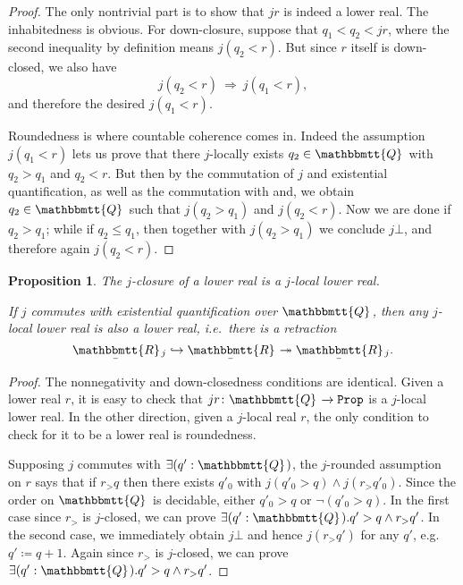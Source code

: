 \documentclass[reqno,11pt]{amsproc}
\newcommand{\tob}[1]{\todo[color=blue!40,inline]{\tn{\textbf{T:} #1}}\noindent}
\theoremstyle{plain}
\newtheorem{proposition}[theorem]{Proposition}
\theoremstyle{definition}
\newcommand{\Const}[1]{\mathtt{#1}}
\renewcommand{\to}[1][]{\xrightarrow{#1}}
\newcommand{\surj}{\twoheadrightarrow}
\newcommand{\inj}{\hookrightarrow}
\newcommand{\tn}[1]{\textnormal{#1}}
\newcommand{\ubar}[1]{\underaccent{\bar}{#1}}
\newcommand{\internal}[1]{\raisebox{-.03ex}{$\mathbbmtt{#1}$}}
\newcommand{\hs}{\hspace{1pt}}
\newcommand{\tqq}{\internal{Q}\hs}
\newcommand{\trr}{\internal{R}}
\newcommand{\tlrr}{\ubar{\trr}\hs}
\newcommand{\prop}{\Const{Prop}}
\newcommand{\imp}{\Rightarrow}
\numberwithin{equation}{section}
\begin{document}
\begin{proof}
	The only nontrivial part is to show that $jr$ is indeed a lower real. The inhabitedness is obvious. For down-closure, suppose that $q_1 < q_2 < jr$, where the second inequality by definition means $j(q_2 < r)$. But since $r$ itself is down-closed, we also have
	\[
		j(q_2 < r) \: \imp \: j(q_1 < r),
	\]
	and therefore the desired $j(q_1 < r)$.

	Roundedness is where countable coherence comes in. Indeed the assumption $j(q_1 < r)$ lets us prove that there $j$-locally exists $q_2 \in \tqq$ with $q_2 > q_1$ and $q_2 < r$. But then by the commutation of $j$ and existential quantification, as well as the commutation with and, we obtain $q_2 \in \tqq$ such that $j(q_2 > q_1)$ and $j(q_2 < r)$. Now we are done if $q_2 > q_1$; while if $q_2 \le q_1$, then together with $j(q_2 > q_1)$ we conclude $j\bot$, and therefore again $j(q_2 < r)$.
\end{proof}

\tob{continue here}

\begin{proposition}
The $j$-closure of a lower real is a $j$-local lower real.

If $j$ commutes with existential quantification over $\tqq$, then any $j$-local lower real is also a lower real, i.e.\ there is a retraction
\[
  \tlrr_j\inj\tlrr\surj\tlrr_j.
\]
\end{proposition}
\begin{proof}
The nonnegativity and down-closedness conditions are identical. Given a lower real $r$, it is easy to check that $jr\colon\tqq\to\prop$ is a $j$-local lower real. In the other direction, given a $j$-local real $r$, the only condition to check for it to be a lower real is roundedness. 

Supposing $j$ commutes with $\exists(q':\tqq)$, the $j$-rounded assumption on $r$ says that if $r_>q$ then there exists $q'_0$ with $j(q'_0>q)\wedge j(r_>q'_0)$. Since the order on $\tqq$ is decidable, either $q'_0>q$ or $\neg(q'_0>q)$. In the first case since $r_>$ is $j$-closed, we can prove $\exists (q':\tqq).q'>q\wedge r_>q'$. In the second case, we immediately obtain $j\bot$ and hence $j(r_>q')$ for any $q'$, e.g.\ $q'\coloneqq q+1$. Again since $r_>$ is $j$-closed, we can prove $\exists (q':\tqq).q'>q\wedge r_>q'$.
\end{proof}
\end{document}
